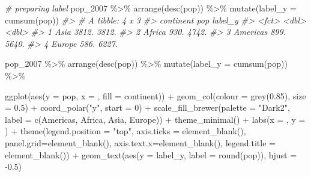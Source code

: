 \documentclass[
]{book}
\newenvironment{Shaded}{\begin{snugshade}}{\end{snugshade}}
\newcommand{\AttributeTok}[1]{\textcolor[rgb]{0.77,0.63,0.00}{#1}}
\newcommand{\CommentTok}[1]{\textcolor[rgb]{0.56,0.35,0.01}{\textit{#1}}}
\newcommand{\DecValTok}[1]{\textcolor[rgb]{0.00,0.00,0.81}{#1}}
\newcommand{\FloatTok}[1]{\textcolor[rgb]{0.00,0.00,0.81}{#1}}
\newcommand{\FunctionTok}[1]{\textcolor[rgb]{0.00,0.00,0.00}{#1}}
\newcommand{\NormalTok}[1]{#1}
\newcommand{\SpecialCharTok}[1]{\textcolor[rgb]{0.00,0.00,0.00}{#1}}
\newcommand{\StringTok}[1]{\textcolor[rgb]{0.31,0.60,0.02}{#1}}
\begin{document}
\begin{Shaded}
\begin{Highlighting}[]
\CommentTok{\# preparing label}
\NormalTok{pop\_2007 }\SpecialCharTok{\%\textgreater{}\%}
\FunctionTok{arrange}\NormalTok{(}\FunctionTok{desc}\NormalTok{(pop)) }\SpecialCharTok{\%\textgreater{}\%}
\FunctionTok{mutate}\NormalTok{(}\AttributeTok{label\_y =} \FunctionTok{cumsum}\NormalTok{(pop))}
\CommentTok{\#\textgreater{} \# A tibble: 4 x 3}
\CommentTok{\#\textgreater{}   continent   pop label\_y}
\CommentTok{\#\textgreater{}   \textless{}fct\textgreater{}     \textless{}dbl\textgreater{}   \textless{}dbl\textgreater{}}
\CommentTok{\#\textgreater{} 1 Asia      3812.   3812.}
\CommentTok{\#\textgreater{} 2 Africa     930.   4742.}
\CommentTok{\#\textgreater{} 3 Americas   899.   5640.}
\CommentTok{\#\textgreater{} 4 Europe     586.   6227.}

\NormalTok{pop\_2007 }\SpecialCharTok{\%\textgreater{}\%}
\FunctionTok{arrange}\NormalTok{(}\FunctionTok{desc}\NormalTok{(pop)) }\SpecialCharTok{\%\textgreater{}\%}
\FunctionTok{mutate}\NormalTok{(}\AttributeTok{label\_y =} \FunctionTok{cumsum}\NormalTok{(pop)) }\SpecialCharTok{\%\textgreater{}\%}

\FunctionTok{ggplot}\NormalTok{(}\FunctionTok{aes}\NormalTok{(}\AttributeTok{y =}\NormalTok{ pop, }\AttributeTok{x =} \StringTok{\textquotesingle{}\textquotesingle{}}\NormalTok{, }\AttributeTok{fill =}\NormalTok{ continent)) }\SpecialCharTok{+} 
   \FunctionTok{geom\_col}\NormalTok{(}\AttributeTok{colour =} \FunctionTok{grey}\NormalTok{(}\FloatTok{0.85}\NormalTok{), }\AttributeTok{size =} \FloatTok{0.5}\NormalTok{) }\SpecialCharTok{+}
   \FunctionTok{coord\_polar}\NormalTok{(}\StringTok{"y"}\NormalTok{, }\AttributeTok{start =} \DecValTok{0}\NormalTok{) }\SpecialCharTok{+}
   \FunctionTok{scale\_fill\_brewer}\NormalTok{(}\AttributeTok{palette =} \StringTok{"Dark2"}\NormalTok{, }\AttributeTok{label =} \FunctionTok{c}\NormalTok{(}\StringTok{\textquotesingle{}Americas\textquotesingle{}}\NormalTok{, }\StringTok{\textquotesingle{}Africa\textquotesingle{}}\NormalTok{, }\StringTok{\textquotesingle{}Asia\textquotesingle{}}\NormalTok{, }\StringTok{\textquotesingle{}Europe\textquotesingle{}}\NormalTok{)) }\SpecialCharTok{+}
   \FunctionTok{theme\_minimal}\NormalTok{() }\SpecialCharTok{+}
   \FunctionTok{labs}\NormalTok{(}\AttributeTok{x =} \StringTok{\textquotesingle{}\textquotesingle{}}\NormalTok{, }\AttributeTok{y =} \StringTok{\textquotesingle{}\textquotesingle{}}\NormalTok{) }\SpecialCharTok{+}
   \FunctionTok{theme}\NormalTok{(}\AttributeTok{legend.position =} \StringTok{"top"}\NormalTok{, }
         \AttributeTok{axis.ticks =} \FunctionTok{element\_blank}\NormalTok{(), }
         \AttributeTok{panel.grid=}\FunctionTok{element\_blank}\NormalTok{(), }
         \AttributeTok{axis.text.x=}\FunctionTok{element\_blank}\NormalTok{(), }
         \AttributeTok{legend.title =} \FunctionTok{element\_blank}\NormalTok{()) }\SpecialCharTok{+}
   \FunctionTok{geom\_text}\NormalTok{(}\FunctionTok{aes}\NormalTok{(}\AttributeTok{y =}\NormalTok{ label\_y, }\AttributeTok{label =} \FunctionTok{round}\NormalTok{(pop)), }\AttributeTok{hjust =} \SpecialCharTok{{-}}\FloatTok{0.5}\NormalTok{)}
\end{Highlighting}
\end{Shaded}
\end{document}
